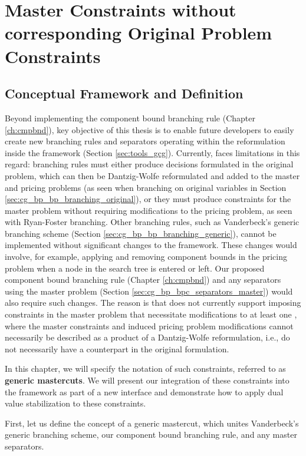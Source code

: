 \chapter{Master Constraints without corresponding Original Problem Constraints}\label{ch:gm}
\section{Conceptual Framework and Definition}\label{sec:gm}
Beyond implementing the component bound branching rule (Chapter \ref{ch:cmpbnd}), key objective of this thesis is to enable future \GCG{} developers to easily create new branching rules and separators operating within the reformulation inside the framework (Section \ref{sec:tools_gcg}). Currently, \GCG{} faces limitations in this regard: branching rules must either produce decisions formulated in the original problem, which can then be Dantzig-Wolfe reformulated and added to the master and pricing problems (as seen when branching on original variables in Section \ref{sec:cg_bp_bp_branching_original}), or they must produce constraints for the master problem without requiring modifications to the pricing problem, as seen with Ryan-Foster branching. Other branching rules, such as Vanderbeck's generic branching scheme (Section \ref{sec:cg_bp_bp_branching_generic}), cannot be implemented without significant changes to the \GCG{} framework. These changes would involve, for example, applying and removing component bounds in the pricing problem when a node in the search tree is entered or left. Our proposed component bound branching rule (Chapter \ref{ch:cmpbnd}) and any separators using the master problem (Section \ref{sec:cg_bp_bpc_separators_master}) would also require such changes. The reason is that \GCG{} does not currently support imposing constraints in the master problem that necessitate modifications to at least one \SP{}, where the master constraints and induced pricing problem modifications cannot necessarily be described as a product of a Dantzig-Wolfe reformulation, i.e., do not necessarily have a counterpart in the original formulation.

In this chapter, we will specify the notation of such constraints, referred to as \textbf{generic mastercuts}. We will present our integration of these constraints into the \GCG{} framework as part of a new interface and demonstrate how to apply dual value stabilization to these constraints.

First, let us define the concept of a generic mastercut, which unites Vanderbeck's generic branching scheme, our component bound branching rule, and any master separators.

